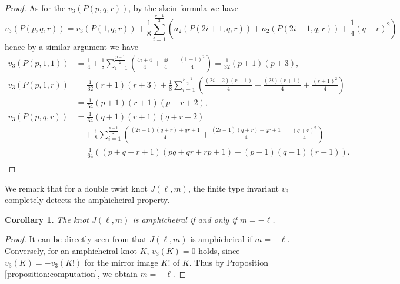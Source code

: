 \documentclass{amsart}
\newtheorem{corollary}[theorem]{Corollary}
\theoremstyle{remark}
\theoremstyle{definition}
\begin{document}
\begin{proof}
As for the $v_3(P(p,q,r))$, by the skein formula we have
\[ v_{3}(P(p,q,r)) = v_{3}(P(1,q,r)) +\frac{1}{8}\sum_{i=1}^{\frac{p-1}{2}}\left( a_{2}(P(2i+1,q,r))+a_2(P(2i-1,q,r))+\frac{1}{4}(q+r)^{2}\right) \]
hence by a similar argument we have 
\begin{align*}
v_{3}(P(p,1,1)) &= \frac{1}{4}+ \frac{1}{8}\sum_{i=1}^{\frac{p-1}{2}}\left(\frac{4i+4}{4}+\frac{4i}{4}+\frac{(1+1)^{2}}{4}\right) = \frac{1}{32}(p+1)(p+3),\\
v_{3}(P(p,1,r)) & = \frac{1}{32}(r+1)(r+3)+ \frac{1}{8}\sum_{i=1}^{\frac{p-1}{2}}\left( \frac{(2i+2)(r+1)}{4}+\frac{(2i)(r+1)}{4} +\frac{(r+1)^{2}}{4}\right)\\
&= \frac{1}{64}(p+1)(r+1)(p+r+2),\\
v_{3}(P(p,q,r)) & = \frac{1}{64}(q+1)(r+1)(q+r+2)\\
& \quad + \frac{1}{8}\sum_{i=1}^{\frac{p-1}{2}}\left( \frac{(2i+1)(q+r)+qr+1}{4}+\frac{(2i-1)(q+r)+qr+1}{4} +\frac{(q+r)^{2}}{4}\right)\\
&= \frac{1}{64}\left( (p+q+r+1)(pq+qr+rp+1)+(p-1)(q-1)(r-1) \right).\\
\end{align*}
\end{proof}


We remark that for a double twist knot $J(\ell,m)$, the finite type invariant $v_{3}$ completely detects the amphicheiral property.

\begin{corollary}\label{cor:J(l,m)amphicheiral}
The knot $J(\ell,m)$ is amphicheiral if and only if $m=-\ell$.
\end{corollary}
\begin{proof}
It can be directly seen from that $J(\ell,m)$ is amphicheiral if $m=-\ell$. 
Conversely, for an amphicheiral knot $K$, $v_{3}(K)=0$ holds, since $v_{3}(K)=-v_{3}(K!)$ for the mirror image $K!$ of $K$. 
Thus by Proposition \ref{proposition:computation}, we obtain $m=-\ell$.

\end{proof}
\end{document}
